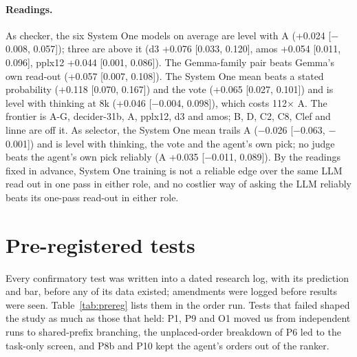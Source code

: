\documentclass[11pt]{article}
\begin{document}
\paragraph{Readings.} As checker, the six System One models on average are level with A (+0.024 [$-$0.008, 0.057]);
three are above it (d3 +0.076 [0.033, 0.120], amos +0.054 [0.011, 0.096], pplx12 +0.044 [0.001, 0.086]). The
Gemma-family pair beats Gemma's own read-out (+0.057 [0.007, 0.108]). The System One mean beats a stated probability
(+0.118 [0.070, 0.167]) and the vote (+0.065 [0.027, 0.101]) and is level with thinking at 8k (+0.046 [$-$0.004,
0.098]), which costs 112$\times$ A. The frontier is A-G, decider-31b, A, pplx12, d3 and amos; B, D, C2, C8, Clef and
linne are off it. As selector, the System One mean trails A ($-$0.026 [$-$0.063, $-$0.001]) and is level with thinking,
the vote and the agent's own pick; no judge beats the agent's own pick reliably (A +0.035 [$-$0.011, 0.089]). By the
readings fixed in advance, System One training is not a reliable edge over the same LLM read out in one pass in
either role, and no costlier way of asking the LLM reliably beats its one-pass read-out in either role.

\FloatBarrier
\section{Pre-registered tests}\label{app:prereg}

Every confirmatory test was written into a dated research log, with its prediction and bar, before any of its data
existed; amendments were logged before results were seen. Table~\ref{tab:prereg} lists them in the order run. Tests
that failed shaped the study as much as those that held: P1, P9 and O1 moved us from independent runs to
shared-prefix branching, the unplaced-order breakdown of P6 led to the task-only screen, and P8b and P10 kept the
agent's orders out of the ranker.
\end{document}
